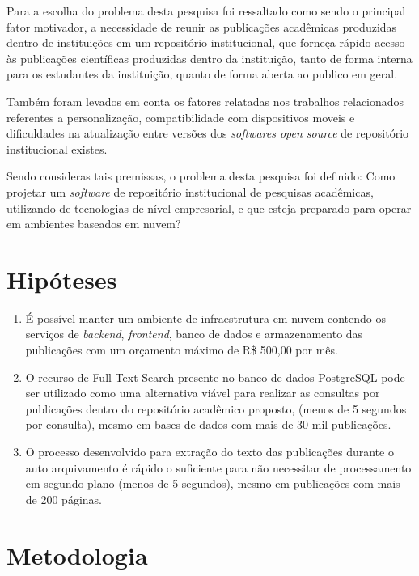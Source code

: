 Para a escolha do problema desta pesquisa foi ressaltado como sendo
o principal fator motivador, a necessidade de reunir as publicações acadêmicas
produzidas dentro de instituições em um repositório institucional,
que forneça rápido acesso às publicações científicas produzidas dentro da
instituição, tanto de forma interna para os estudantes da instituição,
quanto de forma aberta ao publico em geral.

Também foram levados em conta os fatores relatadas nos trabalhos
relacionados referentes a personalização, compatibilidade com
dispositivos moveis e dificuldades na atualização entre versões
dos \emph{softwares open source} de repositório institucional existes.

Sendo consideras tais premissas, o problema desta pesquisa foi definido:
Como projetar um \emph{software} de repositório institucional de pesquisas
acadêmicas, utilizando de tecnologias de nível empresarial, e que esteja
preparado para operar em ambientes baseados em nuvem?

\section{Hipóteses} \label{sec::Hypothesis}
\begin{enumerate}

    \item É possível manter um ambiente de infraestrutura em nuvem
          contendo os serviços de \emph{backend}, \emph{frontend}, banco de dados
          e armazenamento das publicações com um orçamento máximo de R\$ 500,00
          por mês.

    \item O recurso de Full Text Search presente no banco de dados PostgreSQL
          pode ser utilizado como uma alternativa viável para realizar
          as consultas por publicações dentro do repositório acadêmico
          proposto, (menos de 5 segundos por consulta), mesmo em bases de
          dados com mais de 30 mil publicações.

    \item O processo desenvolvido para extração do texto das publicações
          durante o auto arquivamento é rápido o suficiente para não
          necessitar de processamento em segundo plano (menos de 5 segundos),
          mesmo em publicações com mais de 200 páginas.

\end{enumerate}

\section{Metodologia} \label{sec:Methodology}

